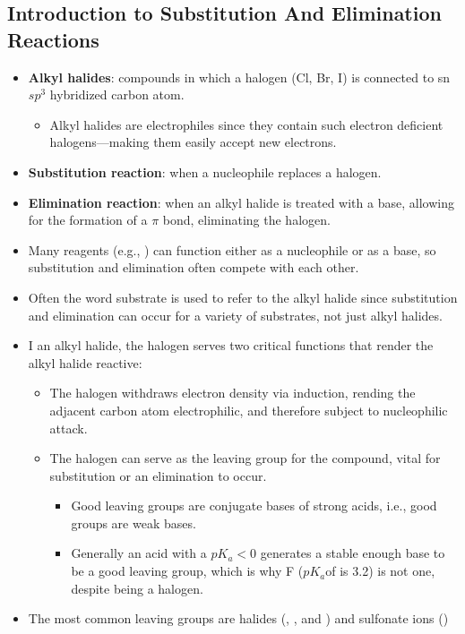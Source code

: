 \documentclass[12pt,a4paper]{article}
\begin{document}
\subsection{Introduction to Substitution And Elimination Reactions}
\begin{itemize}
    \item \textbf{Alkyl halides}: compounds in which a halogen (Cl, Br, I) is connected to sn \(sp^3\) hybridized carbon atom.
        \begin{itemize}
            \item Alkyl halides are electrophiles since they contain such electron deficient halogens---making them easily accept new electrons.
        \end{itemize}
    \item \textbf{Substitution reaction}: when a {\color{neg}nucleophile} replaces a halogen.
    \item \textbf{Elimination reaction}: when an alkyl halide is treated with a {\color{neg}base}, allowing for the formation of a $\pi$ bond, eliminating the halogen.
    \item Many reagents (e.g., {\color{neg}}) can function either as a nucleophile or as a base, so substitution and elimination often compete with each other.
    \item Often the word {\color{o-Sun}substrate} is used to refer to the alkyl halide since substitution and elimination can occur for a variety of substrates, not just alkyl halides.
    \item I an alkyl halide, the halogen serves two critical functions that render the alkyl halide reactive:
        \begin{itemize}
            \item The halogen withdraws electron density via {\color{o-Sun}induction}, rending the adjacent carbon atom electrophilic, and therefore subject to nucleophilic attack.
            \item The halogen can serve as the {\color{o-Sun}leaving group} for the compound, vital for substitution or an elimination to occur.
                \begin{itemize}
                    \item Good leaving groups are conjugate bases of strong acids, i.e., good groups are weak bases.
                    \item Generally an acid with a \(pK_a < 0\) generates a stable enough base to be a good leaving group, which is why F (\(pK_a\)of  is 3.2) is not one, despite being a halogen.
                \end{itemize}
        \end{itemize}
    \item The most common leaving groups are halides ({\color{neg}}, {\color{neg}}, and {\color{neg}}) and sulfonate ions ({\color{neg}})

\end{itemize}
\end{document}
